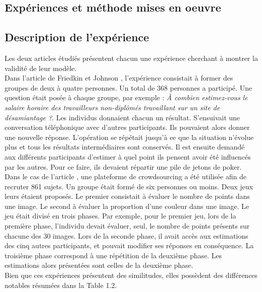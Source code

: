 \documentclass{scrreprt}
\begin{document}
\begin{multicols}{2}

\section{Expériences et méthode mises en oeuvre}


\subsection{Description de l'expérience}

Les deux articles étudiés présentent chacun une expérience cherchant à montrer la validité de leur modèle.\\

Dans l’article de Friedkin et Johnson \cite{FJ}, l’expérience consistait à former des groupes de deux à quatre personnes. Un total de 368 personnes a participé. Une question était posée à chaque groupe, par exemple : \textit{À combien estimez-vous le salaire horaire des travailleurs non-diplômés  travaillant sur un site de désamiantage ?}. Les individus donnaient chacun un résultat. S’ensuivait une conversation téléphonique avec d’autres participants. Ils pouvaient alors donner une nouvelle réponse. L’opération se répétait jusqu’à ce que la situation n’évolue plus et tous les résultats intermédiaires sont conservés. Il est ensuite demandé aux différents participants d’estimer à quel point ils pensent avoir été influencés par les autres. Pour ce faire, ils devaient répartir une pile de jetons de poker.\\

Dans le cas de l’article \cite{VMG}, une plateforme de crowdsourcing a été utilisée afin de recruter 861 sujets. Un groupe était formé de six personnes ou moins. Deux jeux leurs étaient proposés. Le premier consistait à évaluer le nombre de points dans une image. Le second à évaluer la proportion d'une couleur dans une image. Le jeu était divisé en trois phases. Par exemple, pour le premier jeu, lors de la première phase, l'individu devait évaluer, seul, le nombre de points présents sur chacune des 30 images. Lors de la seconde phase, il avait accès aux estimations des cinq autres participants, et pouvait modifier ses réponses en conséquence. La troisième phase correspond à une répétition de la deuxième phase. Les estimations alors présentées sont celles de la deuxième phase. \\

Bien que ces expériences présentent des similitudes, elles possèdent des différences notables résumées dans la Table 1.2.\\

\end{multicols}
\end{document}
